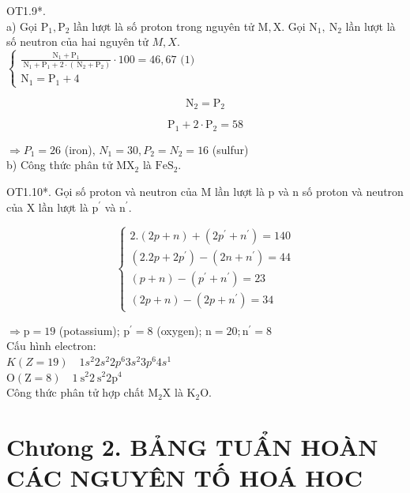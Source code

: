 \documentclass[10pt]{article}
\begin{document}
OT1.9*.\\
a) Gọi $\mathrm{P}_{1}, \mathrm{P}_{2}$ lần lượt là số proton trong nguyên tử $\mathrm{M}, \mathrm{X}$. Gọi $\mathrm{N}_{1}, \mathrm{~N}_{2}$ lần lượt là số neutron của hai nguyên tử $M, X$.\\
$\left\{\begin{array}{l}\frac{\mathrm{N}_{1}+\mathrm{P}_{1}}{\mathrm{~N}_{1}+\mathrm{P}_{1}+2 \cdot\left(\mathrm{~N}_{2}+\mathrm{P}_{2}\right)} \cdot 100=46,67 \text { (1) } \\ \mathrm{N}_{1}=\mathrm{P}_{1}+4\end{array}\right.$


\begin{equation*}
\mathrm{N}_{2}=\mathrm{P}_{2} \tag{3}
\end{equation*}



\begin{equation*}
\mathrm{P}_{1}+2 \cdot \mathrm{P}_{2}=58 \tag{4}
\end{equation*}


$\Rightarrow P_{1}=26$ (iron), $N_{1}=30, P_{2}=N_{2}=16$ (sulfur)\\
b) Công thức phân tử $\mathrm{MX}_{2}$ là $\mathrm{FeS}_{2}$.

OT1.10*. Gọi số proton và neutron của M lần lượt là p và n số proton và neutron của X lần lượt là $\mathrm{p}^{\prime}$ và $\mathrm{n}^{\prime}$.

\[
\left\{\begin{array}{l}2 .(2 p+n)+\left(2 p^{\prime}+n^{\prime}\right)=140  \tag{1}\\ \left(2.2 p+2 p^{\prime}\right)-\left(2 n+n^{\prime}\right)=44 \\ (p+n)-\left(p^{\prime}+n^{\prime}\right)=23 \\ (2 p+n)-\left(2 p+n^{\prime}\right)=34\end{array}\right.
\]

$\Rightarrow \mathrm{p}=19$ (potassium); $\mathrm{p}^{\prime}=8$ (oxygen); $\mathrm{n}=20 ; \mathrm{n}^{\prime}=8$\\
Cấu hình electron:\\
$K(Z=19) \quad 1 s^{2} 2 s^{2} 2 p^{6} 3 s^{2} 3 p^{6} 4 s^{1}$\\
$\mathrm{O}(\mathrm{Z}=8) \quad 1 \mathrm{~s}^{2} 2 \mathrm{~s}^{2} 2 \mathrm{p}^{4}$\\
Công thức phân tử hợp chất $\mathrm{M}_{2} \mathrm{X}$ là $\mathrm{K}_{2} \mathrm{O}$.

\section*{Chưong 2. BẢNG TUẨN HOÀN CÁC NGUYÊN TỐ HOÁ HOC}
\end{document}

